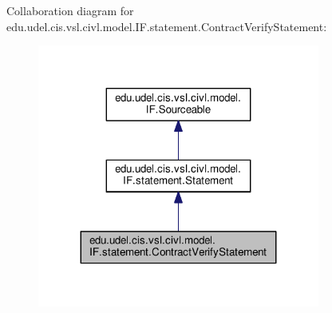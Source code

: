 Collaboration diagram for edu.\+udel.\+cis.\+vsl.\+civl.\+model.\+I\+F.\+statement.\+Contract\+Verify\+Statement\+:
\nopagebreak
\begin{figure}[H]
\begin{center}
\leavevmode
\includegraphics[width=263pt]{interfaceedu_1_1udel_1_1cis_1_1vsl_1_1civl_1_1model_1_1IF_1_1statement_1_1ContractVerifyStatement__coll__graph}
\end{center}
\end{figure}
